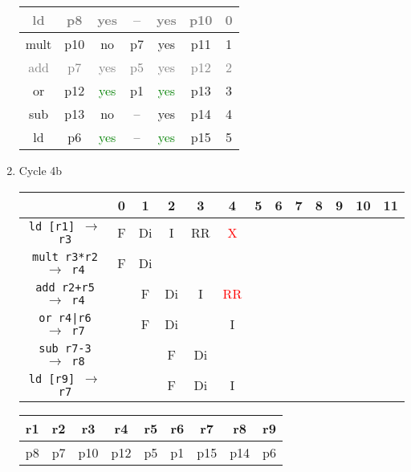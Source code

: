 \documentclass[12pt]{article}
\begin{document}
\begin{enumerate}
\begin{table}[H]
\begin{tabular}{|c|c|c|c|c|c|c|}
					\hline
					\textcolor{gray}{ld} & \textcolor{gray}{p8} & \textcolor{gray}{yes} & \textcolor{gray}{--} & \textcolor{gray}{yes} & \textcolor{gray}{p10} & \textcolor{gray}{0}\\
					\hline
					mult & p10 & no & p7 & yes & p11 & 1\\
					\hline
					\textcolor{gray}{add} & \textcolor{gray}{p7} & \textcolor{gray}{yes} & \textcolor{gray}{p5} & \textcolor{gray}{yes} & \textcolor{gray}{p12} & \textcolor{gray}{2}\\
					\hline
					or & p12 & \textcolor{green}{yes} & p1 & \textcolor{green}{yes} & p13 & 3\\
					\hline
					sub & p13 & no & -- & yes & p14 & 4\\
					\hline
					ld & p6 & \textcolor{green}{yes} & -- & \textcolor{green}{yes} & p15 & 5\\
					\hline
				\end{tabular}
			\end{table}
		\item
			Cycle 4b
			\begin{table}[H]
				\begin{tabular}{|c|c|c|c|c|c|c|c|c|c|c|c|c|}
					\hline
					 & 0 & 1 & 2 & 3 & 4 & 5 & 6 & 7 & 8 & 9 & 10 & 11\\
					\hline
					\texttt{ld [r1] $\rightarrow$ r3} & F & Di & I & RR & \textcolor{red}{X} &  &  &  &  &  &  &\\
					\hline
					\texttt{mult r3*r2 $\rightarrow$ r4} & F & Di &  &  &  &  &  &  &  &  &  &\\
					\hline
					\texttt{add r2+r5 $\rightarrow$ r4} &  & F & Di & I & \textcolor{red}{RR} &  &  &  &  &  &  &\\
					\hline
					\texttt{or r4|r6 $\rightarrow$ r7} &  & F & Di &  & I &  &  &  &  &  &  &\\
					\hline
					\texttt{sub r7-3 $\rightarrow$ r8} &  &  & F & Di &  &  &  &  &  &  &  &\\
					\hline
					\texttt{ld [r9] $\rightarrow$ r7} &  &  & F & Di & I &  &  &  &  &  &  &\\
					\hline 
				\end{tabular}
			\end{table}
			\begin{table}[H]
				\begin{tabular}{|c|c|c|c|c|c|c|c|c|}
					\hline
					r1 & r2 & r3 & r4 & r5 & r6 & r7 & r8 & r9\\
					\hline
					p8 & p7 & p10 & p12 & p5 & p1 & p15 & p14 & p6\\

\end{tabular}
\end{table}
\end{enumerate}
\end{document}

